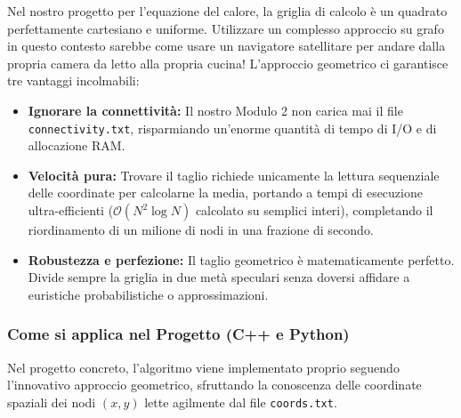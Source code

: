 \documentclass[a4paper,11pt]{article}
\theoremstyle{definition}
\begin{document}
\begin{tcolorbox}[concetto, title={Perché l'approccio geometrico vince a mani basse sulla nostra griglia}]
Nel nostro progetto per l'equazione del calore, la griglia di calcolo è un quadrato perfettamente cartesiano e uniforme. Utilizzare un complesso approccio su grafo in questo contesto sarebbe come usare un navigatore satellitare per andare dalla propria camera da letto alla propria cucina! 
L'approccio geometrico ci garantisce tre vantaggi incolmabili:
\begin{itemize}
    \item \textbf{Ignorare la connettività:} Il nostro Modulo 2 non carica mai il file \texttt{connectivity.txt}, risparmiando un'enorme quantità di tempo di I/O e di allocazione RAM.
    \item \textbf{Velocità pura:} Trovare il taglio richiede unicamente la lettura sequenziale delle coordinate per calcolarne la media, portando a tempi di esecuzione ultra-efficienti ($\mathcal{O}(N^2 \log N)$ calcolato su semplici interi), completando il riordinamento di un milione di nodi in una frazione di secondo.
    \item \textbf{Robustezza e perfezione:} Il taglio geometrico è matematicamente perfetto. Divide sempre la griglia in due metà speculari senza doversi affidare a euristiche probabilistiche o approssimazioni.
\end{itemize}
\end{tcolorbox}

\subsubsection{Come si applica nel Progetto (C++ e Python)}

Nel progetto concreto, l'algoritmo viene implementato proprio seguendo l'innovativo approccio geometrico, sfruttando la conoscenza delle coordinate spaziali dei nodi $(x,y)$ lette agilmente dal file \texttt{coords.txt}.
\end{document}
